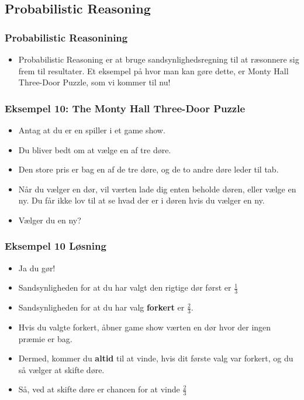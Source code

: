 \documentclass{beamer}
\begin{document}
\subsection{Probabilistic Reasoning}
\label{subsec:probabilistic-reasoning}

\begin{frame}
  \frametitle{Probabilistic Reasonining}
  \begin{itemize}
  \item Probabilistic Reasoning er at bruge sandsynlighedsregning til at ræsonnere sig frem til resultater. Et eksempel på hvor man kan gøre dette, er Monty Hall Three-Door Puzzle, som vi kommer til nu!
  \end{itemize} 
\end{frame}

\begin{frame}
  \frametitle{Eksempel 10: The Monty Hall Three-Door Puzzle}
  \begin{itemize}
  \item Antag at du er en spiller i et game show.
  \item Du bliver bedt om at vælge en af tre døre.
  \item Den store pris er bag en af de tre døre, og de to andre døre leder til tab.
  \item Når du vælger en dør, vil værten lade dig enten beholde døren, eller vælge en ny. Du får ikke lov til at se hvad der er i døren hvis du vælger en ny.
  \item Vælger du en ny? 
  \end{itemize}
\end{frame}

\begin{frame}
  \frametitle{Eksempel 10 Løsning}
  
  \begin{itemize}
  \item Ja du gør!
  \item Sandsynligheden for at du har valgt den rigtige dør først er $\frac{1}{3}$
  \item Sandsynligheden for at du har valg \textbf{forkert} er $\frac{2}{3}$. 
  \item Hvis du valgte forkert, åbner game show værten en dør hvor der ingen præmie er bag.
  \item Dermed, kommer du \textbf{altid} til at vinde, hvis dit første valg var forkert, og du så vælger at skifte døre.
  \item Så, ved at skifte døre er chancen for at vinde $\frac{2}{3}$
  \end{itemize}
\end{frame}
\end{document}
